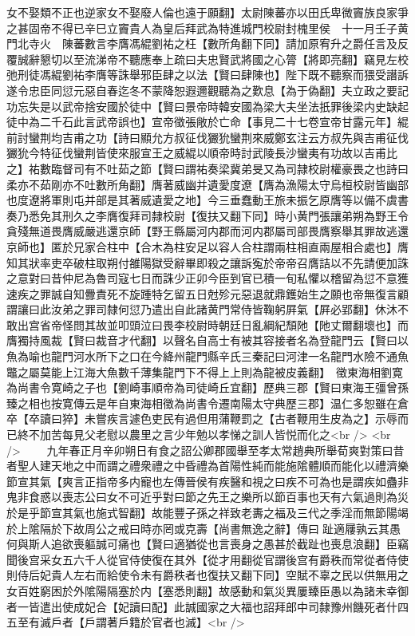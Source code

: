女不娶類不正也逆家女不娶廢人倫也遠于願翻】太尉陳蕃亦以田氏卑微竇族良家爭之甚固帝不得已辛巳立竇貴人為皇后拜武為特進城門校尉封槐里侯　十一月壬子黄門北寺火　陳蕃數言李膺馮緄劉祐之枉【數所角翻下同】請加原宥升之爵任言及反覆誠辭懇切以至流涕帝不聽應奉上疏曰夫忠賢武將國之心膂【將即亮翻】竊見左校弛刑徒馮緄劉祐李膺等誅舉邪臣肆之以法【賢曰肆陳也】陛下既不聽察而猥受譖訴遂令忠臣同愆元惡自春迄冬不蒙降恕遐邇觀聽為之歎息【為于偽翻】夫立政之要記功忘失是以武帝捨安國於徒中【賢曰景帝時韓安國為梁大夫坐法扺罪後梁内史缺起徒中為二千石此言武帝誤也】宣帝徵張敞於亡命【事見二十七卷宣帝甘露元年】緄前討蠻荆均吉甫之功【詩曰顯允方叔征伐玁狁蠻荆來威鄭玄注云方叔先與吉甫征伐玁狁今特征伐蠻荆皆使來服宣王之威緄以順帝時討武陵長沙蠻夷有功故以吉甫比之】祐數臨督司有不吐茹之節【賢曰謂祐奏梁冀弟旻又為司隷校尉權豪畏之也詩曰柔亦不茹剛亦不吐數所角翻】膺著威幽并遺愛度遼【膺為漁陽太守烏桓校尉皆幽部也度遼將軍則屯并部是其著威遺愛之地】今三垂蠢動王旅未振乞原膺等以備不虞書奏乃悉免其刑久之李膺復拜司隸校尉【復扶又翻下同】時小黄門張讓弟朔為野王令貪殘無道畏膺威嚴逃還京師【野王縣屬河内郡而河内郡屬司部畏膺察舉其罪故逃還京師也】匿於兄家合柱中【合木為柱安足以容人合柱謂兩柱相直兩屋相合處也】膺知其狀率吏卒破柱取朔付雒陽獄受辭畢即殺之讓訴寃於帝帝召膺詰以不先請便加誅之意對曰昔仲尼為魯司寇七日而誅少正卯今臣到官已積一旬私懼以稽留為愆不意獲速疾之罪誠自知釁責死不旋踵特乞留五日尅殄元惡退就鼎鑊始生之願也帝無復言顧謂讓曰此汝弟之罪司隸何愆乃遣出自此諸黄門常侍皆鞠躬屛氣【屛必郢翻】休沐不敢出宫省帝怪問其故並叩頭泣曰畏李校尉時朝廷日亂綱紀頹阤【阤丈爾翻壞也】而膺獨持風裁【賢曰裁音才代翻】以聲名自高士有被其容接者名為登龍門云【賢曰以魚為喻也龍門河水所下之口在今絳州龍門縣辛氏三秦記曰河津一名龍門水險不通魚鼈之屬莫能上江海大魚數千薄集龍門下不得上上則為龍被皮義翻】　徵東海相劉寛為尚書令寛崎之子也【劉崎事順帝為司徒崎丘宜翻】歷典三郡【賢曰東海王彊曾孫臻之相也按寛傳云是年自東海相徵為尚書令遷南陽太守典歷三郡】温仁多恕雖在倉卒【卒讀曰猝】未嘗疾言遽色吏民有過但用蒲鞭罰之【古者鞭用生皮為之】示辱而已終不加苦每見父老慰以農里之言少年勉以孝悌之訓人皆悦而化之<br />
<br />
　　九年春正月辛卯朔日有食之詔公卿郡國舉至孝太常趙典所舉荀爽對策曰昔者聖人建天地之中而謂之禮衆禮之中昏禮為首陽性純而能施隂體順而能化以禮濟樂節宣其氣【爽言正指帝多内寵也左傳晉侯有疾醫和視之曰疾不可為也是謂疾如蠱非鬼非食惑以喪志公曰女不可近乎對曰節之先王之樂所以節百事也天有六氣過則為災於是乎節宣其氣也施式智翻】故能豐子孫之祥致老夀之福及三代之季淫而無節陽竭於上隂隔於下故周公之戒曰時亦罔或克壽【尚書無逸之辭】傳曰趾適屨孰云其愚何與斯人追欲喪軀誠可痛也【賢曰適猶從也言喪身之愚甚於截趾也喪息浪翻】臣竊聞後宫采女五六千人從官侍使復在其外【從才用翻從官謂後宫有爵秩而常從者侍使則侍后妃貴人左右而給使令未有爵秩者也復扶又翻下同】空賦不辜之民以供無用之女百姓窮困於外隂陽隔塞於内【塞悉則翻】故感動和氣災異屢臻臣愚以為諸未幸御者一皆遣出使成妃合【妃讀曰配】此誠國家之大福也詔拜郎中司隸豫州饑死者什四五至有滅戶者【戶謂著戶籍於官者也滅】<br />
